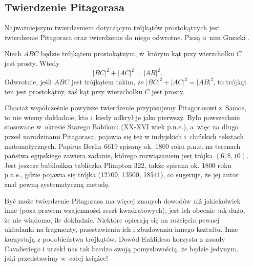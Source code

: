 %

\subsection{Twierdzenie Pitagorasa}
Najważniejszym twierdzeniem dotyczącym trójkątów prostokątnych jest twierdzenie Pitagorasa oraz twierdzenie do niego odwrotne.
Piszą o~nim Guzicki \cite[s. 160]{guzicki_2021}.


\begin{theorem}[Pitagorasa]
%
\label{theorem_pythagorean}%
    Niech $ABC$ będzie trójkątem prostokątnym, w~którym kąt przy wierzchołku $C$ jest prosty.
    Wtedy
    \begin{equation}
        |BC|^2 + |AC|^2 = |AB|^2.
    \end{equation}
    Odwrotnie, jeśli $ABC$ jest trójkątem takim, że $|BC|^2 + |AC|^2 = |AB|^2$, to trójkąt ten jest prostokątny, zaś kąt przy wierzchołku $C$ jest prosty.
\end{theorem}

Chociaż współcześnie powyższe twierdzenie przypisujemy Pitagorasowi z~Samos, to nie wiemy dokładnie, kto i~kiedy odkrył je jako pierwszy.
%
Było powszechnie stosowane w~okresie Starego Babilonu (XX-XVI wiek p.n.e.), a~więc na długo przed narodzinami Pitagorasa; pojawia się też w indyjskich i~chińskich tekstach matematycznych.
Papirus Berlin 6619 spisany ok. 1800 roku p.n.e. na terenach państwa egipskiego zawiera zadanie, którego rozwiązaniem jest trójka $(6, 8, 10)$.
Jest jeszcze babilońksa tabliczka Plimpton 322, także spisana ok. 1800 roku p.n.e., gdzie pojawia się trójka (12709, 13500, 18541), co sugeruje, że jej autor znał pewną systematyczną metodę.

Być może twierdzenie Pitagorasa ma więcej znanych dowodów niż jakiekolwiek inne (poza prawem wzajemności reszt kwadratowych), jest ich obecnie tak dużo, że nie wiadomo, ile dokładnie.
Niektóre opierają się na rozcięciu pewnej układanki na fragmenty, przestawieniu ich i zbudowaniu innego kształtu.
Inne korzystają z podobieństwa trójkątów.
Dowód Euklidesa korzysta z zasady Cavalieriego i urzekł nas tak bardzo swoją pomysłowością, że będzie jedynym, jaki przedstawimy w~całej książce!


